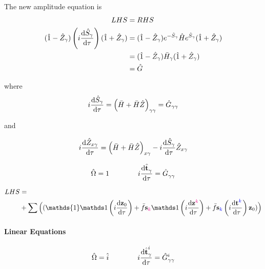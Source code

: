 \documentclass{article}
\newcommand{\bt}{\textbf{t}}
\newcommand{\bs}{\textbf{s}}
\newcommand{\bz}{\textbf{z}}
\newcommand{\down}[1]{\hat{#1}}
\begin{document}
The new amplitude equation is
\begin{align}
    LHS &= RHS
\\
    (\hat{1} - \hat{Z}_{\gamma})\left(i\dv{\hat{S}_{\gamma}}{\tau}\right)(\hat{1} + \hat{Z}_{\gamma})
    &= (\hat{1} - \hat{Z}_{\gamma})e^{-\hat{S}_{\gamma}}\hat{H}e^{\hat{S}_{\gamma}}(\hat{1} + \hat{Z}_{\gamma})
%
\\  &= (\hat{1} - \hat{Z}_{\gamma})\bar{H}_{\gamma}(\hat{1} + \hat{Z}_{\gamma})
\\  &= \hat{G}
\end{align}

where
\begin{align}
    i\dv{\hat{S}_{\gamma}}{\tau} = \left(\bar{H} + \bar{H}\hat{Z}\right)_{\gamma\gamma} = \hat{G}_{\gamma\gamma}
\end{align}

and

\begin{align}
    i\dv{\hat{Z}_{x\gamma}}{\tau} = \left(\bar{H} + \bar{H}\hat{Z}\right)_{x\gamma} - i\dv{\hat{S}_{\gamma}}{\tau}\hat{Z}_{x\gamma}
\end{align}

\clearpage
%
%
%
%
%
%


\vspace{2cm}%
%
%
%
%

\begin{equation}
    \hat{\Omega} = 1
\qquad\qquad
    i\dv{\hat{\bt}^{}_{\gamma}}{\tau} = \hat{G}^{}_{\gamma\gamma}
\end{equation}

%
%
%
%
%

\begin{align}\begin{split}
LHS &=
%
%
\\&+\sum\Big((\mathds{1}\mathds1\left(i\dv{\bz_0}{\tau}\right) + \bar{f}\bs_{\magenta{}\blue{}\magenta{k}\red{}}\mathds1\left(i\dv{\bz^{\magenta{k}\red{}}}{\tau}\right) + \bar{f}\bs_{\magenta{}\blue{k}\magenta{}\red{}}\left(i\dv{\bt^{\blue{k}\blue{}\red{}}}{\tau}\right)\bz_0)\Big)
\end{split}\end{align}

\paragraph{Linear Equations}

%
%
%
%
%

\begin{equation}
    \hat{\Omega} = \down{i}
\qquad\qquad
    i\dv{\hat{\bt}^{i}_{\gamma}}{\tau} = \hat{G}^{i}_{\gamma\gamma}
\end{equation}
\end{document}
